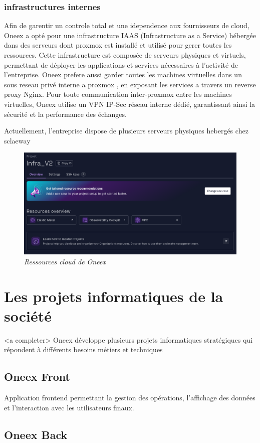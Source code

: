 \subsubsection{infrastructures internes}

Afin de garentir un controle total et une idependence aux fournisseurs de cloud, Oneex a opté pour une infrastructure IAAS (Infrastructure as a Service) hébergée dans des serveurs dont proxmox est installé et utilisé pour gerer toutes les ressources. Cette infrastructure est composée de serveurs physiques et virtuels, permettant de déployer les applications et services nécessaires à l’activité de l’entreprise.
Oneex prefere aussi garder toutes les machines virtuelles dans un sous reseau privé interne a proxmox , en exposant les services a travers un reverse proxy Nginx.
Pour toute communication inter-proxmox entre les machines virtuelles, Oneex utilise un VPN IP-Sec réseau interne dédié, garantissant ainsi la sécurité et la performance des échanges.

Actuellement, l'entreprise dispose de plusieurs serveurs physiques hebergés chez sclaeway
\begin{figure} [H]
	\centering
	\includegraphics[width=.5\textwidth]{figures/Ressources cloud.png}
	\caption{\textit{Ressources cloud de Oneex}}
	\label{fig:Ressources cloud de Oneex}
\end{figure}
\section{Les projets informatiques de la société}
<a completer>
Oneex développe plusieurs projets informatiques stratégiques qui répondent à différents besoins métiers et techniques

\subsection{Oneex Front}

Application frontend permettant la gestion des opérations, l’affichage des données et l’interaction avec les utilisateurs finaux.

\subsection{Oneex Back}

